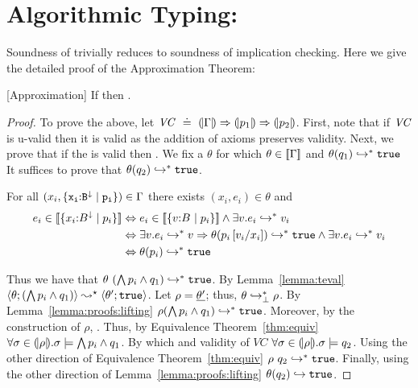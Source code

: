 \section{Algorithmic Typing: \declang}

Soundness of \declang trivially reduces to soundness of implication checking.
Here we give the detailed proof of the Approximation Theorem:
\begin{theorem}{[Approximation]}\label{thm:approximation} 
  If  then .
\end{theorem}
\begin{proof}
To prove the above, let ${\VC \defeq \VCOND{\Env}{p_1}{p_2}}$. First, note that
if $\VC$ is u-valid then it is valid as the addition of axioms preserves
validity. Next, we prove that if the \VC is valid then .
%
We fix a $\theta$ for which 
$ \theta \in \interp{\Gamma}$ and 
$\evals{\thetasub{\theta}{q_1}}{\etrue}$
%
It suffices to prove that 
$\evals{\thetasub{\theta}{q_2}}{\etrue}$.

For all $(x_i, \tlref{x_i}{B}{\trivial}{p_i}) \in \Gamma$
there exists $(x_i, e_i) \in \theta$ and
\begin{align*}
	e_i \in \interp{\tref{x_i}{B}{\trivial}{p_i}}
&\Leftrightarrow
	e_i \in \interp{\tref{v}{B}{}{p_i}}
	\land
	\exists v. \evals{e_i}{v_i}  \\
&\Leftrightarrow
	\exists v. \evals{e_i}{v} \Rightarrow 
	\evals{\thetasub{\theta}{p_i\sub{x_i}{v_i}}}{\etrue}
	\land
	\exists v. \evals{e_i}{v_i}  \\
&\Leftrightarrow
	\evals{\thetasub{\theta}{p_i}}{\etrue}\\
\end{align*}

Thus we have that 
$\evals{\theta\ (\bigwedge p_i \land q_1)}{\etrue}$.
%
By Lemma~\ref{lemma:teval}
$\tevals{\theta}{(\bigwedge p_i \land q_1)}{\theta'}{\etrue}$.
%
Let $\rho = \mkbot{\theta'}$;
thus, $\trackevals{\theta}{\rho}$.
By Lemma~\ref{lemma:proofs:lifting}
$\evals{\thetasub{\rho}{\bigwedge p_i \land q_1}}{\etrue}$.
%
Moreover, by the construction of $\rho$, 
.
Thus, by Equivalence Theorem~\ref{thm:equiv}
$\forall \sigma \in \embed{\rho}. 
\lmodels{\sigma}{\bigwedge p_i \land q_1}$.
%
By which and validity of $VC$
$\forall \sigma \in \embed{\rho}. 
\lmodels{\sigma}{q_2}$.
%
Using the other direction of Equivalence Theorem~\ref{thm:equiv}
$\evals{\rho\ q_2}{\etrue}$.
%
Finally, using the other direction of Lemma~\ref{lemma:proofs:lifting}
$\eval{\thetasub{\theta}{q_2}}{\etrue}$.
\end{proof}

